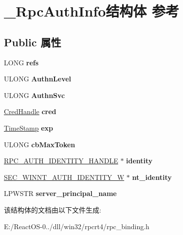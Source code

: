 \hypertarget{struct___rpc_auth_info}{}\section{\+\_\+\+Rpc\+Auth\+Info结构体 参考}
\label{struct___rpc_auth_info}
\subsection*{Public 属性}
\begin{DoxyCompactItemize}
\item 
\mbox{\label{struct___rpc_auth_info_ad02f10a4ee7312cb72f752134f229fb5}} 
L\+O\+NG {\bfseries refs}
\item 
\mbox{\label{struct___rpc_auth_info_a57355b126ce4abff6b8ed1bb26d91aae}} 
U\+L\+O\+NG {\bfseries Authn\+Level}
\item 
\mbox{\label{struct___rpc_auth_info_a654979c357cf20ae617f5b9a592c7436}} 
U\+L\+O\+NG {\bfseries Authn\+Svc}
\item 
\mbox{\label{struct___rpc_auth_info_a7276889b2e4724b361083d0f5563b2e9}} 
\hyperlink{struct___sec_handle}{Cred\+Handle} {\bfseries cred}
\item 
\mbox{\label{struct___rpc_auth_info_a6dfeb2439a1fd6974a0707b7a21843d3}} 
\hyperlink{struct___s_e_c_u_r_i_t_y___i_n_t_e_g_e_r}{Time\+Stamp} {\bfseries exp}
\item 
\mbox{\label{struct___rpc_auth_info_ab08ffc76768184ee411660e27c877bf1}} 
U\+L\+O\+NG {\bfseries cb\+Max\+Token}
\item 
\mbox{\label{struct___rpc_auth_info_a519cbdf4ca8b8cac81ec2fc41f26985c}} 
\hyperlink{interfacevoid}{R\+P\+C\+\_\+\+A\+U\+T\+H\+\_\+\+I\+D\+E\+N\+T\+I\+T\+Y\+\_\+\+H\+A\+N\+D\+LE} $\ast$ {\bfseries identity}
\item 
\mbox{\label{struct___rpc_auth_info_a9b0704f7c50cef75b9f4ec336406b531}} 
\hyperlink{struct___s_e_c___w_i_n_n_t___a_u_t_h___i_d_e_n_t_i_t_y___w}{S\+E\+C\+\_\+\+W\+I\+N\+N\+T\+\_\+\+A\+U\+T\+H\+\_\+\+I\+D\+E\+N\+T\+I\+T\+Y\+\_\+W} $\ast$ {\bfseries nt\+\_\+identity}
\item 
\mbox{\label{struct___rpc_auth_info_af37e3d3d41685b9c1f75b17de003444c}} 
L\+P\+W\+S\+TR {\bfseries server\+\_\+principal\+\_\+name}
\end{DoxyCompactItemize}


该结构体的文档由以下文件生成\+:\begin{DoxyCompactItemize}
\item 
E\+:/\+React\+O\+S-\/0../dll/win32/rpcrt4/rpc\+\_\+binding.\+h\end{DoxyCompactItemize}
